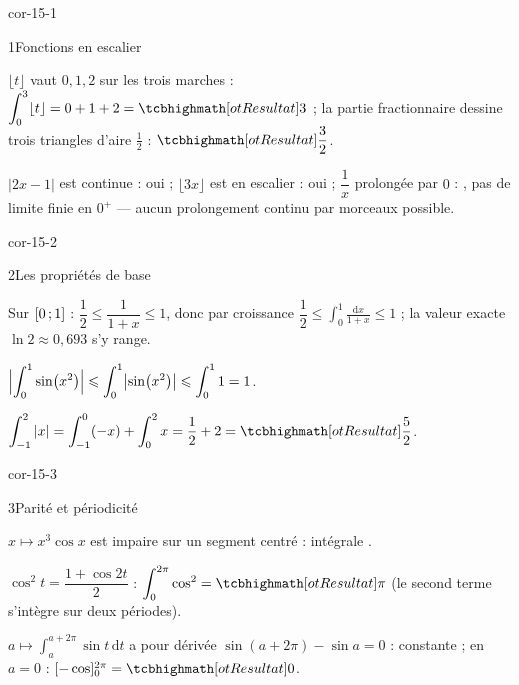 
\corrigesSouples

\begin{blocLivre}{cor-15-1}
\begin{corrige}{1}{Fonctions en escalier}
\begin{questions}
  \item $\lfloor t\rfloor$ vaut $0,1,2$ sur les trois marches :
    $\displaystyle\int_{0}^{3}\lfloor t\rfloor=0+1+2=\res{3}$ ; la partie
    fractionnaire dessine trois triangles d'aire $\frac12$ :
    $\res{\dfrac32}$.
  \item $|2x-1|$ est continue : oui ; $\lfloor3x\rfloor$ est en escalier :
    oui ; $\dfrac1x$ prolongée par $0$ : , pas de limite
    finie en $0^{+}$ — aucun prolongement continu par morceaux possible.
\end{questions}
\end{corrige}
\end{blocLivre}

\begin{blocLivre}{cor-15-2}
\begin{corrige}{2}{Les propriétés de base}
\begin{questions}
  \item Sur $\mathopen{[}0\,{;}\,1\mathclose{]}$ : $\dfrac12\leqslant\dfrac{1}{1+x}\leqslant1$,
    donc par croissance $\dfrac12\leqslant\displaystyle\int_{0}^{1}
    \frac{\mathrm{d}x}{1+x}\leqslant1$ ; la valeur exacte
    $\ln2\approx0{,}693$ s'y range.
  \item $\Bigl|\displaystyle\int_{0}^{1}\sin\bigl(x^{2}\bigr)\Bigr|
    \leqslant\displaystyle\int_{0}^{1}\bigl|\sin\bigl(x^{2}\bigr)\bigr|
    \leqslant\displaystyle\int_{0}^{1}1=1$.
  \item $\displaystyle\int_{-1}^{2}|x|
    =\int_{-1}^{0}(-x)+\int_{0}^{2}x=\frac12+2=\res{\dfrac52}$.
\end{questions}
\end{corrige}
\end{blocLivre}

\begin{blocLivre}{cor-15-3}
\begin{corrige}{3}{Parité et périodicité}
\begin{questions}
  \item $x\mapsto x^{3}\cos x$ est impaire sur un segment centré :
    intégrale .
  \item $\cos^{2}t=\dfrac{1+\cos2t}{2}$ :
    $\displaystyle\int_{0}^{2\pi}\cos^{2}=\res{\pi}$ (le second terme
    s'intègre sur deux périodes).
  \item $a\mapsto\displaystyle\int_{a}^{a+2\pi}\sin t\,\mathrm{d}t$ a pour
    dérivée $\sin(a+2\pi)-\sin a=0$ : constante ; en $a=0$ :
    $[-\cos]_{0}^{2\pi}=\res{0}$.
\end{questions}
\end{corrige}
\end{blocLivre}


